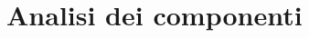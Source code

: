 \documentclass[11pt, a4paper]{article}
\theoremstyle{definition}
\begin{document}

% 







\newpage
\section{Analisi dei componenti}
\end{document}
